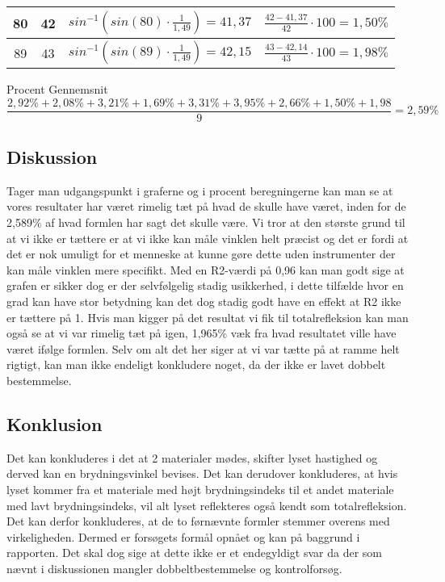 \begin{table}[h]
\begin{tabular}{|c|c|c|c|}
        \hline
        80 & 42 & \begin{math}sin^{-1}(sin(80)\cdot \frac{1}{1,49}) = 41,37\end{math} & \begin{math}\frac{42 - 41,37}{42} \cdot 100 = 1,50\%\end{math}\\
        \hline
        89 & 43 & \begin{math}sin^{-1}(sin(89)\cdot \frac{1}{1,49}) = 42,15\end{math} & \begin{math}\frac{43 - 42,14}{43} \cdot 100 = 1,98\%\end{math}\\
        \hline
    \end{tabular}
\end{table}

Procent Gennemsnit
\begin{equation*}
    \frac{2,92\% + 2,08\% + 3,21\% + 1,69\% + 3,31\% + 3,95\% + 2,66\% + 1,50\% + 1,98}{9} = 2,59\%
\end{equation*}

\subsection{Diskussion}
Tager man udgangspunkt i graferne og i procent beregningerne kan man se at vores resultater har været rimelig tæt på hvad de skulle have været, inden for de 2,589\% af hvad formlen har sagt det skulle være. Vi tror at den største grund til at vi ikke er tættere er at vi ikke kan måle vinklen helt præcist og det er fordi at det er nok umuligt for et menneske at kunne gøre dette uden instrumenter der kan måle vinklen mere specifikt. Med en R2-værdi på 0,96 kan man godt sige at grafen er sikker dog er der selvfølgelig stadig usikkerhed, i dette tilfælde hvor en grad kan have stor betydning kan det dog stadig godt have en effekt at R2  ikke er tættere på 1. Hvis man kigger på det resultat vi fik til totalrefleksion kan man også se at vi var rimelig tæt på igen, 1,965\% væk fra hvad resultatet ville have været ifølge formlen. Selv om alt det her siger at vi var tætte på at ramme helt rigtigt, kan man ikke endeligt konkludere noget, da der ikke er lavet dobbelt bestemmelse.

\subsection{Konklusion}
Det kan konkluderes i det at 2 materialer mødes, skifter lyset hastighed og derved kan en brydningsvinkel bevises. Det kan derudover konkluderes, at hvis lyset kommer fra et materiale med højt brydningsindeks til et andet materiale med lavt brydningsindeks, vil alt lyset reflekteres også kendt som totalrefleksion. Det kan derfor konkluderes, at de to førnævnte formler stemmer overens med virkeligheden. Dermed er forsøgets formål opnået og kan på baggrund i rapporten. Det skal dog sige at dette ikke er et endegyldigt svar da der som nævnt i diskussionen mangler dobbeltbestemmelse og kontrolforsøg. 